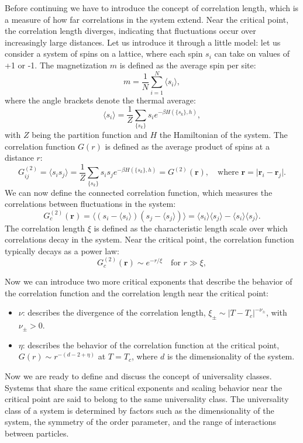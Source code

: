 Before continuing we have to introduce the concept of correlation length, which is a measure of how far correlations in the system extend. Near the critical point, the correlation length diverges, indicating that fluctuations occur over increasingly large distances. Let us introduce it through a little model: let us consider a system of spins on a lattice, where each spin \(s_i\) can take on values of +1 or -1.
The magnetization \(m\) is defined as the average spin per site:
\[
    m = \frac{1}{N} \sum_{i=1}^N \langle s_i \rangle,
\]
where the angle brackets denote the thermal average:
\[
    \langle s_i \rangle = \frac{1}{Z} \sum_{\{s_k\}} s_i e^{-\beta H(\{s_k\},h)},
\]
with \(Z\) being the partition function and \(H\) the Hamiltonian of the system. The correlation function \(G(r)\) is defined as the average product of spins at a distance \(r\):
\[
    G^{(2)}_{ij} = \langle s_i s_j \rangle = \frac{1}{Z} \sum_{\{s_k\}} s_i s_j e^{-\beta H(\{s_k\},h)} = G^{(2)}(\mathbf{r}), \quad \text{where } \mathbf{r} = \vert \mathbf{r}_i - \mathbf{r}_j \vert.
\]
We can now define the connected correlation function, which measures the correlations between fluctuations in the system:
\[
    G_c^{(2)}(\mathbf{r}) = \langle \left(s_i - \langle s_i \rangle\right) \left(s_j - \langle s_j \rangle\right) \rangle = \langle s_i \rangle \langle s_j \rangle - \langle s_i \rangle \langle s_j \rangle.
\]
The correlation length \(\xi\) is defined as the characteristic length scale over which correlations decay in the system. Near the critical point, the correlation function typically decays as a power law:
\[
    G_c^{(2)}(\mathbf{r}) \sim e^{- r/\xi} \quad \text{for } r \gg \xi,
\]

Now we can introduce two more critical exponents that describe the behavior of the correlation function and the correlation length near the critical point:
\begin{itemize}
    \item $\nu$: describes the divergence of the correlation length, $\xi_{\pm} \sim |T - T_c|^{-\nu_{\pm}}$, with \(\nu_{\pm}>0\).
    \item $\eta$: describes the behavior of the correlation function at the critical point, $G(r) \sim r^{-(d-2+\eta)}$ at $T = T_c$, where $d$ is the dimensionality of the system.
\end{itemize}

Now we are ready to define and discuss the concept of universality classes. Systems that share the same critical exponents and scaling behavior near the critical point are said to belong to the same universality class. The universality class of a system is determined by factors such as the dimensionality of the system, the symmetry of the order parameter, and the range of interactions between particles.

